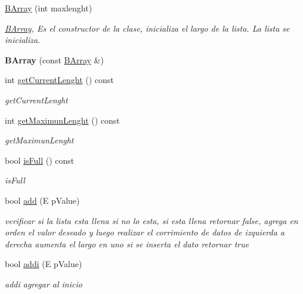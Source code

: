 \begin{DoxyCompactItemize}
\item 
\hyperlink{classBArray_a93c786886ce92be7cf5917bbe6be7956}{B\-Array} (int maxlenght)
\begin{DoxyCompactList}\small\item\em \hyperlink{classBArray}{B\-Array}, Es el constructor de la clase, inicializa el largo de la lista. La lista se inicializa. \end{DoxyCompactList}\item 
\hypertarget{classBArray_aa79aa57a0cd0a3bc048e01be7ec1ef74}{{\bfseries B\-Array} (const \hyperlink{classBArray}{B\-Array} \&)}\label{classBArray_aa79aa57a0cd0a3bc048e01be7ec1ef74}

\item 
int \hyperlink{classBArray_acb72f5d604c4efd007f05c6b6f9746cd}{get\-Current\-Lenght} () const 
\begin{DoxyCompactList}\small\item\em get\-Current\-Lenght \end{DoxyCompactList}\item 
int \hyperlink{classBArray_a744bcd9f9edb779366a116c2b2b96ba7}{get\-Maximun\-Lenght} () const 
\begin{DoxyCompactList}\small\item\em get\-Maximun\-Lenght \end{DoxyCompactList}\item 
bool \hyperlink{classBArray_a2235e8c213fc88b3c6702eaa8c63852c}{is\-Full} () const 
\begin{DoxyCompactList}\small\item\em is\-Full \end{DoxyCompactList}\item 
bool \hyperlink{classBArray_a8e05e0ba69438392d90c9ec639971d27}{add} (E p\-Value)
\begin{DoxyCompactList}\small\item\em verificar si la lista esta llena si no lo esta, si esta llena retornar false, agrega en orden el valor deseado y luego realizar el corrimiento de datos de izquierda a derecha aumenta el largo en uno si se inserta el dato retornar true \end{DoxyCompactList}\item 
bool \hyperlink{classBArray_adaa70e5af76d77d9d389ae7e762b2df8}{addi} (E p\-Value)
\begin{DoxyCompactList}\small\item\em addi agregar al inicio \end{DoxyCompactList}\item 

\end{DoxyCompactItemize}
